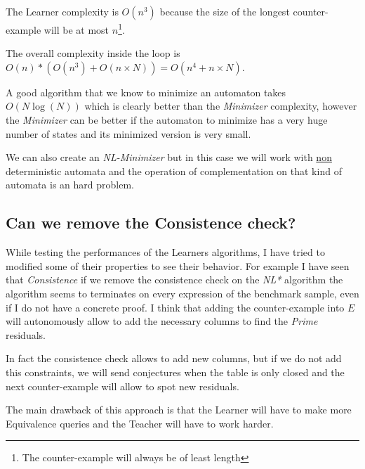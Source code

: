 The Learner complexity is $O(n^3)$ because the size of the longest counter-example will be at most $n$\footnote{The counter-example will always be of least length}.

The overall complexity inside the loop is $O(n)*(O(n^3) + O(n \times N)) = O(n^4 + n \times N)$.

A good algorithm that we know to minimize an automaton takes $O(N \log(N))$ which is clearly better than the \textit{Minimizer} complexity, however the \textit{Minimizer} can be better if the automaton to minimize has a very huge number of states and its minimized version is very small.

We can also create an \textit{NL-Minimizer} but in this case we will work with \underline{non} deterministic automata and the operation of complementation on that kind of automata is an hard problem.

\subsection{Can we remove the Consistence check?}

While testing the performances of the Learners algorithms, I have tried to modified some of their properties to see their behavior. For example I have seen that \textit{Consistence} if we remove the consistence check on the \textit{NL*} algorithm the algorithm seems to terminates on every expression of the benchmark sample, even if I do not have a concrete proof. I think that adding the counter-example into $E$ will autonomously allow to add the necessary columns to find the \textit{Prime} residuals.

In fact the consistence check allows to add new columns, but if we do not add this constraints, we will send conjectures when the table is only closed and the next counter-example will allow to spot new residuals.

The main drawback of this approach is that the Learner will have to make more Equivalence queries and the Teacher will have to work harder.
